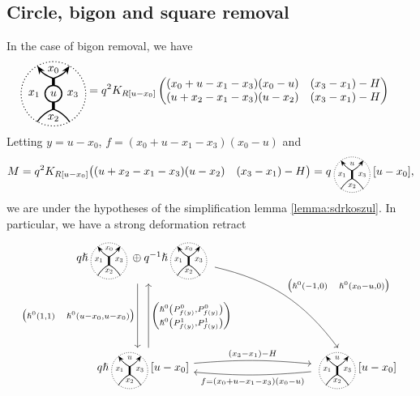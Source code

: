 \documentclass{article}
\newcommand{\kmf}[2]{
	K_{#1}{\begin{pmatrix}
			#2
		\end{pmatrix}
	}	
}
\theoremstyle{plain} %
\theoremstyle{definition} %
\theoremstyle{remark} %
\begin{document}
\subsection{Circle, bigon and square removal}
In the case of bigon removal, we have
\begin{align*}
	\BigonStandard{u} &= q^2K_{R[u-x_0]}
	\begin{pmatrix}
		(x_0+u-x_1-x_3)(x_0-u) & (x_3-x_1)-H\\
		(u+x_2-x_1-x_3)(u-x_2) & (x_3-x_1)-H
	\end{pmatrix}
\end{align*}
Letting $y=u-x_0$, $f=(x_0+u-x_1-x_3)(x_0-u)$ and 
$$
M
=
q^2\kmf{R[u-x_0]}{(u+x_2-x_1-x_3)(u-x_2) & (x_3-x_1)-H}
=
q\scalebox{0.7}{\ThickEdge{u}{x_1}{x_2}{x_3}}[u-x_0] 
,
$$ 
we are under the hypotheses of the simplification lemma \ref{lemma:sdrkoszul}. In particular, we have a strong deformation retract
\[
\begin{tikzcd}[column sep=3cm, row sep=2cm]
	q\hslash \scalebox{0.7}{\ThickEdgeStandard}\oplus q^{-1}\hslash \scalebox{0.7}{\ThickEdgeStandard} 
	\arrow[d, shift right=2, "{\begin{pmatrix} \hslash^0(1,1) \quad \hslash^0(u-x_0,u-x_0)\end{pmatrix}}", swap] 
	\arrow[dr, bend left=20, "{\begin{pmatrix} \hslash^0(-1,0) \quad \hslash^0(x_0-u,0)\end{pmatrix}}"] 
	&
	\\   
	q\hslash \scalebox{0.7}{\ThickEdge{u}{x_1}{x_2}{x_3}}[u-x_0] 
	\arrow[u, shift right=2, "{\begin{pmatrix} \hslash^0\left (P^0_{f(y)}, P^0_{f(y)}\right)
			\\    
			\hslash^0\left(P^1_{f(y)}, P^1_{f(y)}\right)
	\end{pmatrix}}"
	, swap]
	\arrow[r, "(x_3-x_1)-H", bend left=5]
	& 
	\scalebox{0.7}{\ThickEdge{u}{x_1}{x_2}{x_3}}[u-x_0] 
	\arrow[l, "f=(x_0+u-x_1-x_3)(x_0-u)", bend left=5]
\end{tikzcd}
\]
\end{document}
